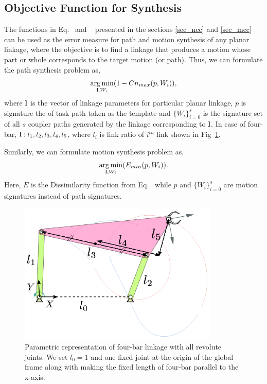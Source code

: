 \subsection{Objective Function for Synthesis}
The functions in Eq.~ and ~ presented in the sections \ref{sec_ncc} and \ref{sec_mcc} can be used as the error measure for path and motion synthesis of any planar linkage, where the objective is to find a linkage that produces a motion whose part or whole corresponds to the target motion (or path).
Thus, we can formulate the path synthesis problem as,
\begin{equation}\label{objectiveFunPath}
  \argminA_{\textbf{\emph{l}}, W_i} (1 - Cn_{max}(p, W_i)),
\end{equation}
where $\textbf{\emph{l}}$ is the vector of linkage parameters for particular planar linkage, $p$ is signature the of task path taken as the template and ${\{W_i\}}_{i=0}^{s}$ is the signature set of all $s$ coupler paths generated by the linkage corresponding to $\textbf{\emph{l}}$.
In case of four-bar, $\textbf{\emph{l}}: l_1, l_2, l_3, l_4, l_5$, where $l_i$ is link ratio of $i^{th}$ link shown in Fig~\ref{fourbar}.

Similarly, we can formulate motion synthesis problem as,
\begin{equation}\label{objectiveFunMotion}
  \argminA_{\textbf{\emph{l}}, W_i} (E_{min}(p, W_i)).
\end{equation}
Here, $E$ is the Dissimilarity function from Eq.~ while $p$ and ${\{W_i\}}_{i=0}^{s}$ are motion signatures instead of path signatures.

\begin{figure}
\centering
\includegraphics[width=270pt]{jcise-18/figure/fig_fourbar.eps}
  \caption{Parametric representation of four-bar linkage with all revolute joints. We set $l_0 = 1$ and one fixed joint at the origin of the global frame along with making the fixed length of four-bar parallel to the x-axis.}
\label{fourbar}
\end{figure}


